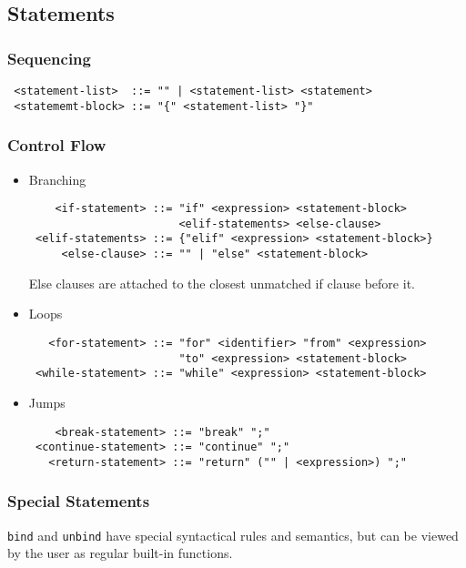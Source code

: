 \subsection{Statements}

\subsubsection{Sequencing}

\begin{verbatim}
 <statement-list>  ::= "" | <statement-list> <statement>
 <statememt-block> ::= "{" <statement-list> "}"
\end{verbatim}

\subsubsection{Control Flow}

\begin{itemize}
\item Branching
\begin{verbatim}
    <if-statement> ::= "if" <expression> <statement-block>
                       <elif-statements> <else-clause>
 <elif-statements> ::= {"elif" <expression> <statement-block>}
     <else-clause> ::= "" | "else" <statement-block>
\end{verbatim}
Else clauses are attached to the closest unmatched if clause before it.

\item Loops
\begin{verbatim}
   <for-statement> ::= "for" <identifier> "from" <expression>
                       "to" <expression> <statement-block>
 <while-statement> ::= "while" <expression> <statement-block>
\end{verbatim}

\item Jumps
\begin{verbatim}
    <break-statement> ::= "break" ";"
 <continue-statement> ::= "continue" ";"
   <return-statement> ::= "return" ("" | <expression>) ";"
\end{verbatim}
\end{itemize}

\subsubsection{Special Statements}

\texttt{bind} and \texttt{unbind} have special syntactical rules and semantics,
but can be viewed by the user as regular built-in functions.

